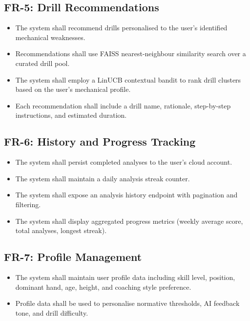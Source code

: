 \subsection{FR-5: Drill Recommendations}

\begin{itemize}
  \item The system shall recommend drills personalised to the user's identified mechanical weaknesses.
  \item Recommendations shall use FAISS nearest-neighbour similarity search over a curated drill pool.
  \item The system shall employ a LinUCB contextual bandit to rank drill clusters based on the user's mechanical profile.
  \item Each recommendation shall include a drill name, rationale, step-by-step instructions, and estimated duration.
\end{itemize}

\subsection{FR-6: History and Progress Tracking}

\begin{itemize}
  \item The system shall persist completed analyses to the user's cloud account.
  \item The system shall maintain a daily analysis streak counter.
  \item The system shall expose an analysis history endpoint with pagination and filtering.
  \item The system shall display aggregated progress metrics (weekly average score, total analyses, longest streak).
\end{itemize}

\subsection{FR-7: Profile Management}

\begin{itemize}
  \item The system shall maintain user profile data including skill level, position, dominant hand, age, height, and coaching style preference.
  \item Profile data shall be used to personalise normative thresholds, AI feedback tone, and drill difficulty.
\end{itemize}

